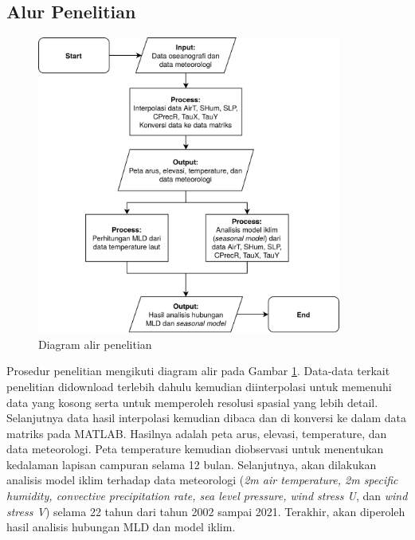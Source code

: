 \begin{spacing}{1.5}
\subsection[Alur Penelitian]{Alur Penelitian}
	\begin{figure}[H]
		\centering
		\includegraphics[width=10cm]{contents/Flowchart_Diagram.png}
		\caption{Diagram alir penelitian}
		\label{fig:flowchart}
	\end{figure}
	Prosedur penelitian mengikuti diagram alir pada Gambar \ref{fig:flowchart}. Data-data terkait penelitian didownload terlebih dahulu kemudian diinterpolasi untuk memenuhi data yang kosong serta untuk memperoleh resolusi spasial yang lebih detail. Selanjutnya data hasil interpolasi kemudian dibaca dan di konversi ke dalam data matriks pada MATLAB. Hasilnya adalah peta arus, elevasi, temperature, dan data meteorologi. Peta temperature kemudian diobservasi untuk menentukan kedalaman lapisan campuran selama 12 bulan. Selanjutnya, akan dilakukan analisis model iklim terhadap data meteorologi (\textit{2m air temperature, 2m specific humidity, convective precipitation rate, sea level pressure, wind stress U}, dan \textit{wind stress V}) selama 22 tahun dari tahun 2002 sampai 2021. Terakhir, akan diperoleh hasil analisis hubungan MLD dan model iklim.
\end{spacing}
\vspace{-0.5pc}

